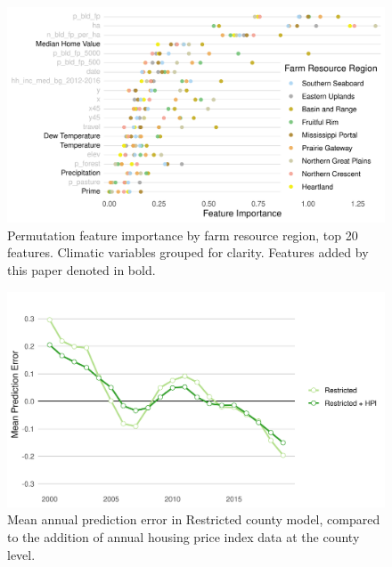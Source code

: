 \documentclass[12pt]{article}
\begin{document}
\begin{figure}[H]
    \centering
    \includegraphics[width=1\textwidth]{exhibits/ffb_importance_t20.png}
    \caption{Permutation feature importance by farm resource region, top 20 features. Climatic variables grouped for clarity. Features added by this paper denoted in bold.}
    \label{fig:ffb_importance}
\end{figure}

\begin{figure}[H]
    \centering
    \includegraphics[width=1\textwidth]{exhibits/nolte_resid_time.png}
    \caption{Mean annual prediction error in Restricted county model, compared to the addition of annual housing price index data at the county level.}
    \label{fig:nolte_resid_time}
\end{figure}
\end{document}
